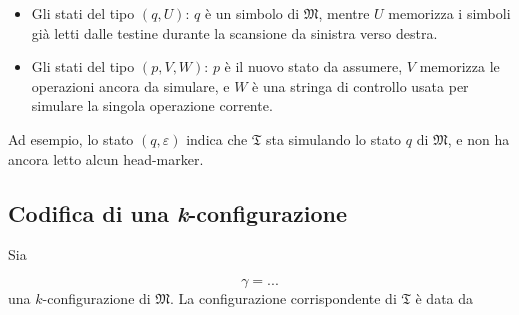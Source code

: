 \begin{itemize}
	\item Gli stati del tipo $(q, U)$: $q$ è un simbolo di $\mathfrak{M}$, mentre $U$ memorizza i simboli già letti dalle testine durante la scansione da sinistra verso destra.
	
	\item Gli stati del tipo $(p, V, W)$: $p$ è il nuovo stato da assumere, $V$ memorizza le operazioni ancora da simulare, e $W$ è una stringa di controllo usata per simulare la singola operazione corrente.
\end{itemize}

Ad esempio, lo stato $(q,\varepsilon)$ indica che $\mathfrak{T}$ sta simulando lo stato $q$ di $\mathfrak{M}$, e non ha ancora letto alcun head-marker.

\subsection{Codifica di una \textit{k}-configurazione}
Sia 

$$
\gamma = ...
$$
%
una $k$-configurazione di $\mathfrak{M}$. La configurazione corrispondente di $\mathfrak{T}$ è data da